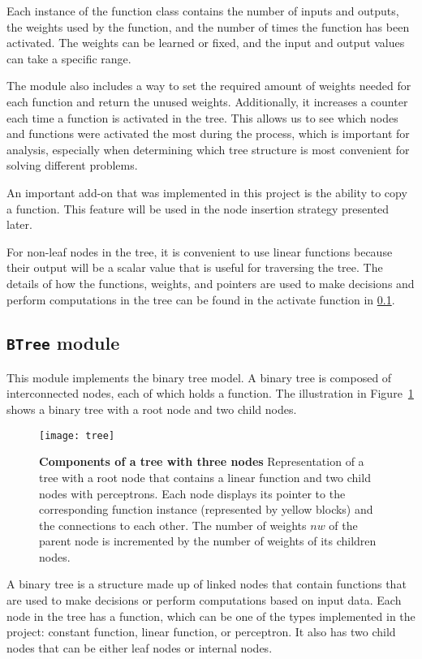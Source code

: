 Each instance of the function class contains the number of inputs and outputs, the weights used by the function, and the number of times the function has been activated. The weights can be learned or fixed, and the input and output values can take a specific range.

The module also includes a way to set the required amount of weights needed for each function and return the unused weights. Additionally, it increases a counter each time a function is activated in the tree. This allows us to see which nodes and functions were activated the most during the process, which is important for analysis, especially when determining which tree structure is most convenient for solving different problems.

An important add-on that was implemented in this project is the ability to copy a function. This feature will be used in the node insertion strategy presented later.

For non-leaf nodes in the tree, it is convenient to use linear functions because their output will be a scalar value that is useful for traversing the tree. The details of how the functions, weights, and pointers are used to make decisions and perform computations in the tree can be found in the activate function in \ref{binary_tree}.

\subsection{\texttt{BTree} module}

\label{binary_tree}
This module implements the binary tree model. A binary tree is composed of interconnected nodes, each of which holds a function. The illustration in Figure~\ref{fig:tree_composition} shows a binary tree with a root node and two child nodes.
\begin{figure}[!ht]
\centering
\texttt{[image: tree]}
\caption[Components of a tree with three nodes]{
  \textbf{Components of a tree with three nodes}
Representation of a tree with a root node that contains a linear function and two child nodes with perceptrons. Each node displays its pointer to the corresponding function instance (represented by yellow blocks) and the connections to each other. The number of weights $nw$ of the parent node is incremented by the number of weights of its children nodes.
 }
\label{fig:tree_composition}
\end{figure}
A binary tree is a structure made up of linked nodes that contain functions that are used to make decisions or perform computations based on input data. Each node in the tree has a function, which can be one of the types implemented in the project: constant function, linear function, or perceptron. It also has two child nodes that can be either leaf nodes or internal nodes.


